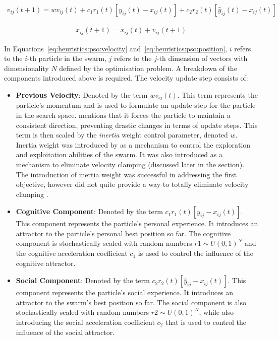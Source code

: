 \begin{equation}
      \label{eq:heuristics:pso:velocity}
      \begin{split}
            v_{ij}(t+1) = wv_{ij}(t) + c_{1}r_{1}(t)[y_{ij}(t) - x_{ij}(t)] + c_{2}r_{2}(t)[\hat{y}_{ij}(t) - x_{ij}(t)]
      \end{split}
\end{equation}

\begin{equation}
      \label{eq:heuristics:pso:position}
      \begin{split}
            x_{ij}(t+1) = x_{ij}(t) + v_{ij}(t+1)
      \end{split}
\end{equation}

In Equations~\ref{eq:heuristics:pso:velocity} and~\ref{eq:heuristics:pso:position}, $i$ refers to the $i$-th particle in the swarm, $j$ refers to the $j$-th dimension of vectors with dimensionality $N$ defined by the optimisation problem. A breakdown of the components introduced above is required. The velocity update step consists of:

\begin{itemize}
      \item \textbf{Previous Velocity}: Denoted by the term $wv_{ij}(t)$. This term represents the particle's momentum and is used to formulate an update step for the particle in the search space. \citeauthor{ref:vanwyk:2014}\cite{ref:vanwyk:2014} mentions that it forces the particle to maintain a consistent direction, preventing drastic changes in terms of update steps. This term is then scaled by the \textit{inertia} weight control parameter, denoted $w$. Inertia weight was introduced by \citeauthor{ref:shi:1998}\cite{ref:shi:1998} as a mechanism to control the exploration and exploitation abilities of the swarm. It was also introduced as a mechanism to eliminate velocity clamping (discussed later in the section). The introduction of inertia weight was successful in addressing the first objective, however did not quite provide a way to totally eliminate velocity clamping \cite{ref:shi:2001}.

      \item \textbf{Cognitive Component}: Denoted by the term $c_{1}r_{1}(t)[y_{ij} - x_{ij}(t)]$. This component represents the particle's personal  experience. It introduces an attractor to the particle's personal best position so far. The cognitive component is stochastically scaled with random numbers $r{1} \sim U(0,1)^N$ and the cognitive acceleration coefficient $c_{1}$ is used to control the influence of the cognitive attractor.

      \item \textbf{Social Component}: Denoted by the term $c_{2}r_{2}(t)[\hat{y}_{ij} - x_{ij}(t)]$. This component represents the particle's social  experience. It introduces an attractor to the swarm's best position so far. The social component is also stochastically scaled with random numbers $r{2} \sim U(0,1)^N$, while also introducing the social acceleration coefficient $c_{2}$ that is used to control the influence of the social attractor.
\end{itemize}

